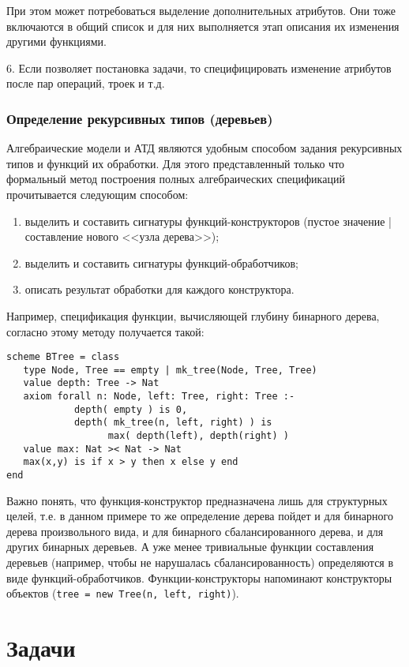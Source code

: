 \documentclass[14pt, twoside]{extreport}
\newcommand{\head}[1]{\vspace{1cm}\subsubsection*{#1}}
\begin{document}
При этом может потребоваться выделение дополнительных атрибутов. Они тоже включаются в общий список и для них выполняется этап описания их изменения другими функциями.

6. Если позволяет постановка задачи, то специфицировать изменение атрибутов после пар операций, троек и т.д.


\head{Определение рекурсивных типов (деревьев)}
Алгебраические модели и АТД являются удобным способом задания рекурсивных типов и функций их обработки. Для этого представленный только что формальный метод построения полных алгебраических спецификаций прочитывается следующим способом:
\begin{enumerate}
  \item выделить и составить сигнатуры функций-конструкторов (пустое значение | составление нового <<узла дерева>>);
  \item выделить и составить сигнатуры функций-обработчиков;
  \item описать результат обработки для каждого конструктора.
\end{enumerate}
Например, спецификация функции, вычисляющей глубину бинарного дерева, согласно этому методу получается такой:
\begin{lstlisting}
scheme BTree = class
   type Node, Tree == empty | mk_tree(Node, Tree, Tree)
   value depth: Tree -> Nat
   axiom forall n: Node, left: Tree, right: Tree :-
            depth( empty ) is 0,
            depth( mk_tree(n, left, right) ) is
                  max( depth(left), depth(right) )
   value max: Nat >< Nat -> Nat
   max(x,y) is if x > y then x else y end
end
\end{lstlisting}
Важно понять, что функция-конструктор предназначена лишь для структурных целей, т.е. в данном примере то же определение дерева пойдет и для бинарного дерева произвольного вида, и для бинарного сбалансированного дерева, и для других бинарных деревьев. А уже менее тривиальные функции составления деревьев (например, чтобы не нарушалась сбалансированность) определяются в виде функций-обработчиков. Функции-конструкторы напоминают конструкторы объектов (\texttt{tree = new Tree(n, left, right)}).

\section*{Задачи}






\end{document}
